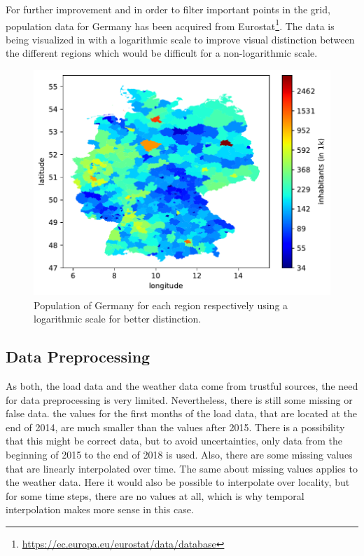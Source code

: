 For further improvement and in order to filter important points in the grid, population data for Germany has been acquired from Eurostat\footnote{\url{https://ec.europa.eu/eurostat/data/database}}. The data is being visualized in  with a logarithmic scale to improve visual distinction between the different regions which would be difficult for a non-logarithmic scale.\\

\begin{figure}[h!]%
\centering
\includegraphics[width=\textwidth]{plots/demo/demo2018_logscale}%
\caption{Population of Germany for each region respectively using a logarithmic scale for better distinction.}%
\label{fig:demo2018_logscale}%
\end{figure}


\subsection*{Data Preprocessing}

As both, the load data and the weather data come from trustful sources, the need for data preprocessing is very limited. Nevertheless, there is still some missing or false data. \Eg the values for the first months of the load data, that are located at the end of 2014, are much smaller than the values after 2015. There is a possibility that this might be correct data, but to avoid uncertainties, only data from the beginning of 2015 to the end of 2018 is used. Also, there are some missing values that are linearly interpolated over time. The same about missing values applies to the weather data. Here it would also be possible to interpolate over locality, but for some time steps, there are no values at all, which is why temporal interpolation makes more sense in this case.\\


